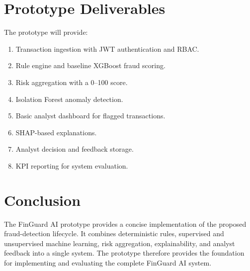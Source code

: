 \documentclass[11pt,a4paper]{article}
\begin{document}
\section{Prototype Deliverables}

The prototype will provide:

\begin{enumerate}[leftmargin=1.5em,itemsep=2pt]
\item Transaction ingestion with JWT authentication and RBAC.
\item Rule engine and baseline XGBoost fraud scoring.
\item Risk aggregation with a 0--100 score.
\item Isolation Forest anomaly detection.
\item Basic analyst dashboard for flagged transactions.
\item SHAP-based explanations.
\item Analyst decision and feedback storage.
\item KPI reporting for system evaluation.
\end{enumerate}

\section{Conclusion}

The FinGuard AI prototype provides a concise implementation of the proposed fraud-detection
lifecycle. It combines deterministic rules, supervised and unsupervised machine learning,
risk aggregation, explainability, and analyst feedback into a single system. The prototype
therefore provides the foundation for implementing and evaluating the complete FinGuard AI
system.
\end{document}
